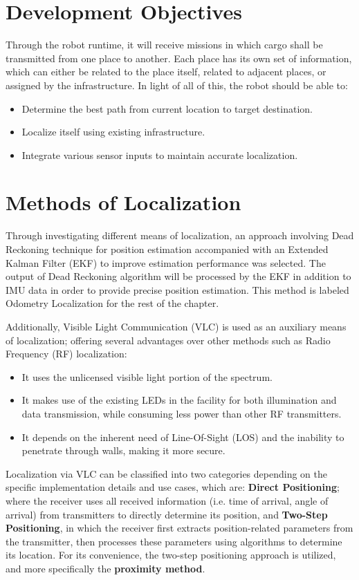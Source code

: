 \section{Development Objectives}
Through the robot runtime, it will receive missions in which cargo shall be transmitted from one place to another. Each place has its own set of information, which can either be related to the place itself, related to adjacent places, or assigned by the infrastructure. In light of all of this, the robot should be able to:
\begin{itemize}
	\item Determine the best path from current location to target destination.
	\item Localize itself using existing infrastructure.
	\item Integrate various sensor inputs to maintain accurate localization.
\end{itemize}

\section{Methods of Localization}
Through investigating different means of localization, an approach involving Dead Reckoning technique for position estimation accompanied with an Extended Kalman Filter (EKF) to improve estimation performance was selected. The output of Dead Reckoning algorithm will be processed by the EKF in addition to IMU data in order to provide precise position estimation. This method is labeled Odometry Localization for the rest of the chapter.

Additionally, Visible Light Communication (VLC) is used as an auxiliary means of localization; offering several advantages over other methods such as Radio Frequency (RF) localization:

\begin{itemize}
	\item It uses the unlicensed visible light portion of the spectrum.
	\item It makes use of the existing LEDs in the facility for both illumination and data transmission, while consuming less power than other RF transmitters.
	\item It depends on the inherent need of Line-Of-Sight (LOS) and the inability to penetrate through walls, making it more secure.
\end{itemize}

Localization via VLC can be classified into two categories depending on the specific implementation details and use cases, which are: \textbf{Direct Positioning}; where the receiver uses all received information (i.e. time of arrival, angle of arrival) from transmitters to directly determine its position, and \textbf{Two-Step Positioning}, in which the receiver first extracts position-related parameters from the transmitter, then processes these parameters using algorithms to determine its location. 
For its convenience, the two-step positioning approach is utilized, and more specifically the \textbf{proximity method}.%

